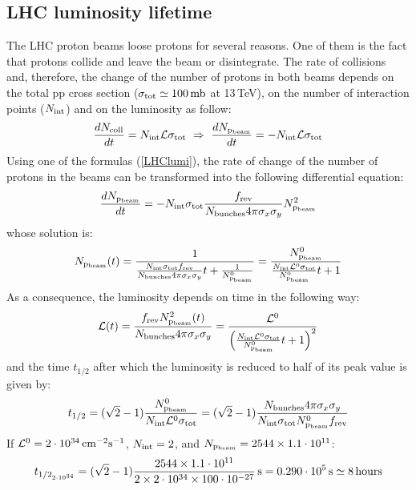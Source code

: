 \documentclass[10pt]{article}
\begin{document}
\subsection{LHC luminosity lifetime}
The LHC proton beams loose protons for several reasons. One of them is the fact that protons collide and leave the beam or disintegrate. The rate of collisions and, therefore, the change of the number of protons in both beams depends on the total pp cross section ($\sigma_{\rm tot} \simeq 100\,{\rm mb}$ at 13\,TeV), on the number of interaction points ($N_{\rm int}$) and on the luminosity as follow:
\begin{equation}
\frac{dN_{\rm coll}}{dt} = N_{\rm int}{\cal L}\sigma_{\rm tot}\ \Rightarrow\ \frac{dN_{\rm p_{beam}}}{dt} = - N_{\rm int}{\cal L}\sigma_{\rm tot}
\end{equation}
Using one of the formulas (\ref{LHClumi}), the rate of change of the number of protons in the beams can be transformed into the following differential equation:
\begin{equation}
\frac{dN_{\rm p_{beam}}}{dt} = - N_{\rm int}\sigma_{\rm tot} \frac{f_{\rm rev}}{N_{\rm bunches}4\pi\sigma_x\sigma_y}N_{\rm p_{beam}}^2
\end{equation}
whose solution is:
\begin{equation}
N_{\rm p_{beam}}(t) = \frac{1}{\frac{N_{\rm int}\sigma_{\rm tot}f_{\rm rev}}{N_{\rm bunches}4\pi\sigma_x\sigma_y}t+\frac{1}{N^0_{\rm p_{beam}}}} = \frac{{N^0_{\rm p_{beam}}}}{\frac{N_{\rm int}{\cal L}^0\sigma_{\rm tot}}{{N^0_{\rm p_{beam}}}}t+1}
\end{equation}
As a consequence, the luminosity depends on time in the following way:
\begin{equation}
{\cal L}(t) = \frac{f_{\rm rev}N_{\rm p_{beam}}^2(t)}{N_{\rm bunches}4\pi\sigma_x\sigma_y} = 
\frac{{\cal L}^0}{\left(\frac{N_{\rm int}{\cal L}^0\sigma_{\rm tot}}{N^0_{\rm p_{beam}}}t+1\right)^2}
\label{lumivstime}
\end{equation}
and the time $t_{1/2}$ after which the luminosity is reduced to half of its peak value is given by:
\begin{equation}
t_{1/2} = (\sqrt{2}-1)\frac{N^0_{\rm p_{beam}}}{N_{\rm int}{\cal L}^0\sigma_{\rm tot}} = (\sqrt{2}-1)\frac{N_{\rm bunches} 4\pi\sigma_x\sigma_y}{N_{\rm int}\sigma_{\rm tot}N^0_{\rm p_{beam}}f_{\rm rev}}
\end{equation}
If ${\cal L}^0=2\cdot 10^{34}\,{\rm cm^{-2}s^{-1}}$, $N_{\rm int}=2$, and $N_{\rm p_{beam}} = 2544\times 1.1\cdot 10^{11}$:
\begin{equation}
t_{1/2_{2\cdot 10^{34}}} = (\sqrt{2}-1)\frac{2544\times 1.1\cdot 10^{11}}{2\times 2\cdot 10^{34}\times 100\cdot 10^{-27}}\,{\rm s} = 0.290 \cdot 10^5\,{\rm s}\simeq 8\,{\rm hours}
\end{equation}
\end{document}
